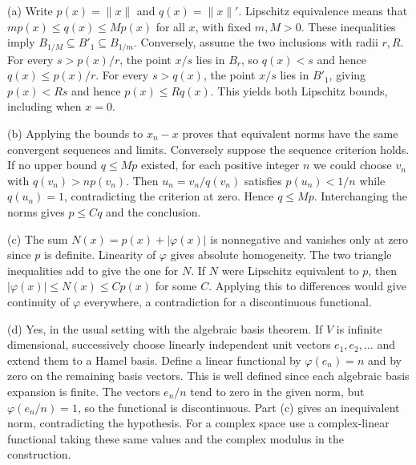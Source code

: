 (a) Write $p(x)=\|x\|$ and $q(x)=\|x\|'$. Lipschitz equivalence means that $mp(x)\le q(x)\le Mp(x)$ for all $x$, with fixed $m,M>0$. These inequalities imply $B_{1/M}\subseteq B'_1\subseteq B_{1/m}$. Conversely, assume the two inclusions with radii $r,R$. For every $s>p(x)/r$, the point $x/s$ lies in $B_r$, so $q(x)<s$ and hence $q(x)\le p(x)/r$. For every $s>q(x)$, the point $x/s$ lies in $B'_1$, giving $p(x)<Rs$ and hence $p(x)\le Rq(x)$. This yields both Lipschitz bounds, including when $x=0$.

(b) Applying the bounds to $x_n-x$ proves that equivalent norms have the same convergent sequences and limits. Conversely suppose the sequence criterion holds. If no upper bound $q\le Mp$ existed, for each positive integer $n$ we could choose $v_n$ with $q(v_n)>n p(v_n)$. Then $u_n=v_n/q(v_n)$ satisfies $p(u_n)<1/n$ while $q(u_n)=1$, contradicting the criterion at zero. Hence $q\le Mp$. Interchanging the norms gives $p\le Cq$ and the conclusion.

(c) The sum $N(x)=p(x)+|\varphi(x)|$ is nonnegative and vanishes only at zero since $p$ is definite. Linearity of $\varphi$ gives absolute homogeneity. The two triangle inequalities add to give the one for $N$. If $N$ were Lipschitz equivalent to $p$, then $|\varphi(x)|\le N(x)\le Cp(x)$ for some $C$. Applying this to differences would give continuity of $\varphi$ everywhere, a contradiction for a discontinuous functional.

(d) Yes, in the usual setting with the algebraic basis theorem. If $V$ is infinite dimensional, successively choose linearly independent unit vectors $e_1,e_2,\ldots$ and extend them to a Hamel basis. Define a linear functional by $\varphi(e_n)=n$ and by zero on the remaining basis vectors. This is well defined since each algebraic basis expansion is finite. The vectors $e_n/n$ tend to zero in the given norm, but $\varphi(e_n/n)=1$, so the functional is discontinuous. Part (c) gives an inequivalent norm, contradicting the hypothesis. For a complex space use a complex-linear functional taking these same values and the complex modulus in the construction.
